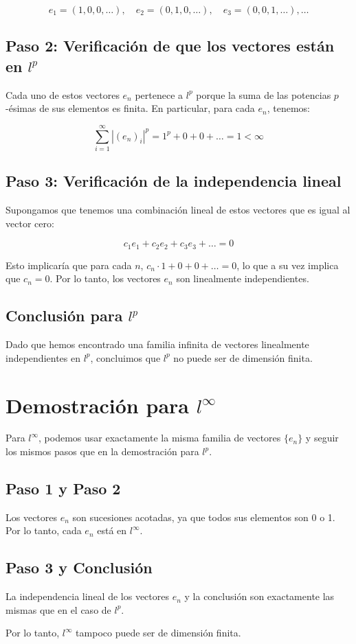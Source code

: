 \documentclass{article}
\begin{document}
\[
e_1 = (1, 0, 0, \ldots), \quad e_2 = (0, 1, 0, \ldots), \quad e_3 = (0, 0, 1, \ldots), \ldots
\]

\subsection*{Paso 2: Verificación de que los vectores están en \( l^p \)}

Cada uno de estos vectores \( e_n \) pertenece a \( l^p \) porque la suma de las potencias \( p \)-ésimas de sus elementos es finita. En particular, para cada \( e_n \), tenemos:

\[
\sum_{i=1}^\infty |(e_n)_i|^p = 1^p + 0 + 0 + \ldots = 1 < \infty
\]

\subsection*{Paso 3: Verificación de la independencia lineal}

Supongamos que tenemos una combinación lineal de estos vectores que es igual al vector cero:

\[
c_1 e_1 + c_2 e_2 + c_3 e_3 + \ldots = 0
\]

Esto implicaría que para cada \( n \), \( c_n \cdot 1 + 0 + 0 + \ldots = 0 \), lo que a su vez implica que \( c_n = 0 \). Por lo tanto, los vectores \( e_n \) son linealmente independientes.

\subsection*{Conclusión para \( l^p \)}

Dado que hemos encontrado una familia infinita de vectores linealmente independientes en \( l^p \), concluimos que \( l^p \) no puede ser de dimensión finita.

\section*{Demostración para \( l^\infty \)}

Para \( l^\infty \), podemos usar exactamente la misma familia de vectores \( \{ e_n \} \) y seguir los mismos pasos que en la demostración para \( l^p \).

\subsection*{Paso 1 y Paso 2}

Los vectores \( e_n \) son sucesiones acotadas, ya que todos sus elementos son 0 o 1. Por lo tanto, cada \( e_n \) está en \( l^\infty \).

\subsection*{Paso 3 y Conclusión}

La independencia lineal de los vectores \( e_n \) y la conclusión son exactamente las mismas que en el caso de \( l^p \).

Por lo tanto, \( l^\infty \) tampoco puede ser de dimensión finita.
\end{document}
